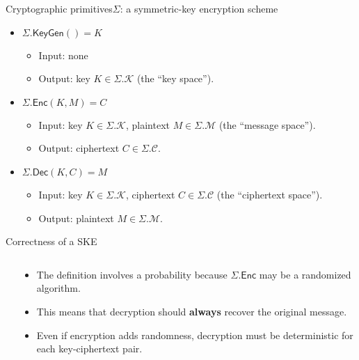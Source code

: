\documentclass[aspectratio=169, lualatex, handout]{beamer}
\begin{document}
\begin{frame}{Cryptographic primitives}{$\Sigma$: a symmetric-key encryption scheme}
	\begin{itemize}
		\item \textbf{$\Sigma.\textsf{KeyGen}() = K$}
		      \begin{itemize}
			      \item Input: none
			      \item Output: key $K \in \Sigma.\mathcal{K}$ {\tiny(the ``key space'')}.
		      \end{itemize}
		\item \textbf{$\Sigma.\textsf{Enc}(K, M) = C$}
		      \begin{itemize}
			      \item Input: key $K \in \Sigma.\mathcal{K}$, plaintext $M \in \Sigma.\mathcal{M}$ {\tiny(the ``message space'')}.
			      \item Output: ciphertext $C \in \Sigma.\mathcal{C}$.
		      \end{itemize}
		\item \textbf{$\Sigma.\textsf{Dec}(K, C) = M$}
		      \begin{itemize}
			      \item Input: key $K \in \Sigma.\mathcal{K}$, ciphertext $C \in \Sigma.\mathcal{C}$ {\tiny(the ``ciphertext space'')}.
			      \item Output: plaintext $M \in \Sigma.\mathcal{M}$.
		      \end{itemize}
	\end{itemize}
\end{frame}

\begin{frame}{Correctness of a SKE}
	\begin{columns}[c]
		\begin{column}{0.5\textwidth}
		\end{column}
		\begin{column}{0.5\textwidth}
			\begin{itemize}
				\item The definition involves a probability because $\Sigma.\textsf{Enc}$ may be a randomized algorithm.
				\item This means that decryption should \textbf{always} recover the original message.
				\item Even if encryption adds randomness, decryption must be deterministic for each key-ciphertext pair.
			\end{itemize}
		\end{column}
	\end{columns}
\end{frame}
\end{document}
